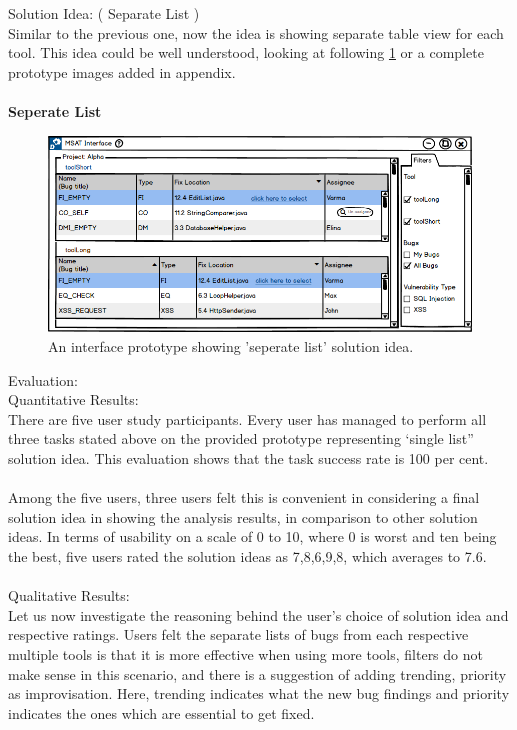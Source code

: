 Solution Idea: ( Separate List ) \\

Similar to the previous one, now the idea is showing separate table view for each tool. This idea could be well understood, looking at following \ref{fig:S11_seperate_list} or a complete prototype images added in appendix. \\ \\

\textbf{Seperate List}
\begin{figure}[hbt!]
	\centering
	\includegraphics[width=\linewidth]{figures/solution_ideas_snaps/S11_seperate_list}
	\caption{An interface prototype showing 'seperate list' solution idea.}
	\label{fig:S11_seperate_list}
\end{figure}

Evaluation: \\

Quantitative Results: \\

There are five user study participants. Every user has managed to perform all three tasks stated above on the provided prototype representing ‘single list” solution idea. This evaluation shows that the task success rate is 100 per cent. \\ \\

Among the five users, three users felt this is convenient in considering a final solution idea in showing the analysis results, in comparison to other solution ideas.  In terms of usability on a scale of 0 to 10, where 0 is worst and ten being the best, five users rated the solution ideas as 7,8,6,9,8, which averages to 7.6. \\ \\


Qualitative Results: \\

Let us now investigate the reasoning behind the user’s choice of solution idea and respective ratings. Users felt the separate lists of bugs from each respective multiple tools is that it is more effective when using more tools, filters do not make sense in this scenario, and there is a suggestion of adding trending, priority as improvisation. Here, trending indicates what the new bug findings and priority indicates the ones which are essential to get fixed. \\ \\

